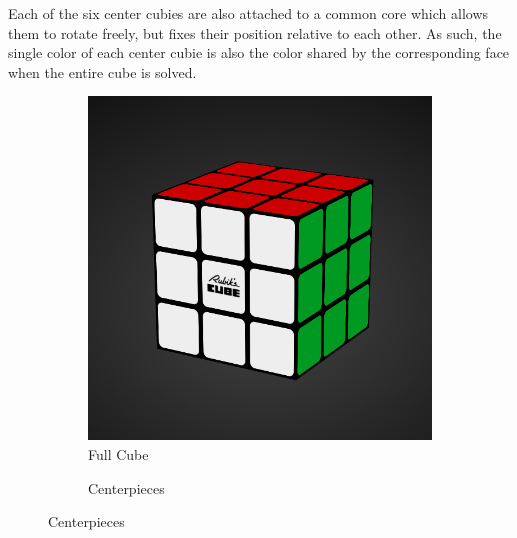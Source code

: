 Each of the six center cubies are also attached to a common core which
allows them to rotate freely, but fixes their position relative to each
other. As such, the single color of each center cubie is also the color
shared by the corresponding face when the entire cube is solved.

\newpage
\null  %
\vfill
\begin{figure}[h]
    \centering
    \caption{The Anatomy of the Rubik's Cube \cite{iamthecube}}
    \label{fig:anatomy}
    \begin{subfigure}{0.5\textwidth}
        \centering
        \caption{Full Cube}
        \label{fig:anatomy-cube}
        \includegraphics[width=.90\linewidth]{Figures/2 Background/anatomy-cube.png}
    \end{subfigure}%
    \begin{subfigure}{0.5\textwidth}
        \centering
        \caption{Centerpieces}
        \label{fig:anatomy-centers}

\end{subfigure}
\end{figure}
